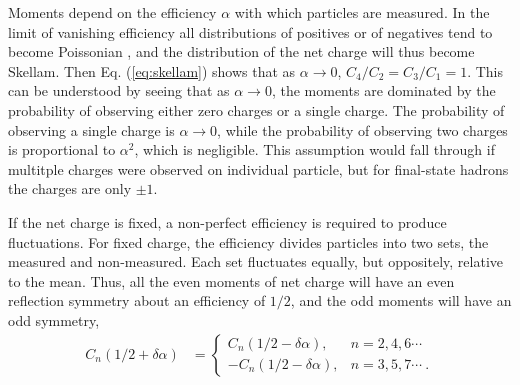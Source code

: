 Moments depend on the efficiency $\alpha$ with which particles are measured. In the limit of vanishing efficiency all distributions of positives or of negatives tend to become Poissonian \cite{Bzdak:2012ab}, and the distribution of the net charge will thus become Skellam. Then Eq. (\ref{eq:skellam}) shows that as $\alpha\rightarrow 0$, $C_4/C_2=C_3/C_1=1$. This can be understood by seeing that as $\alpha\rightarrow 0$, the moments are dominated by the probability of observing either zero charges or a single charge. The probability of observing a single charge is $\alpha\rightarrow 0$, while the probability of observing two charges is proportional to $\alpha^2$, which is negligible. This assumption would fall through if multitple charges were observed on individual particle, but for final-state hadrons the charges are only $\pm 1$.

If the net charge is fixed, a non-perfect efficiency is required to produce fluctuations. For fixed charge, the efficiency divides particles into two sets, the measured and non-measured. Each set fluctuates equally, but oppositely, relative to the mean. Thus, all the even moments of net charge will have an even reflection symmetry about an efficiency of $1/2$, and the odd moments will have an odd symmetry,
\begin{eqnarray}
\label{eq:alphasymm}
C_n(1/2+\delta\alpha)&=\left\{\begin{array}{rl}
C_n(1/2-\delta\alpha),&n=2,4,6\cdots\\
-C_n(1/2-\delta\alpha),&n=3,5,7\cdots~.\end{array}\right.
\end{eqnarray}
